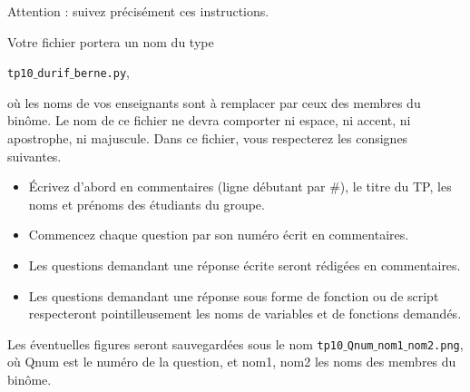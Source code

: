 Attention : suivez précisément ces instructions. 

Votre fichier portera un nom du type 
\begin{center}
  \texttt{tp10$\_$durif$\_$berne.py},
\end{center}
 où les noms de vos enseignants sont à remplacer par ceux des membres du binôme. Le nom de ce 
fichier ne devra comporter ni espace, ni accent, ni apostrophe, ni majuscule.
Dans ce fichier, vous respecterez les consignes suivantes.
\begin{itemize}
  \item \'Ecrivez d'abord en commentaires (ligne débutant par \#), le titre du TP, les noms et prénoms des étudiants du groupe.
  \item Commencez chaque question par son numéro écrit en commentaires.
  \item Les questions demandant une réponse écrite seront rédigées en commentaires.
  \item Les questions demandant une réponse sous forme de fonction ou de script respecteront pointilleusement les noms de variables et de fonctions demandés.
\end{itemize}
Les éventuelles figures seront sauvegardées sous le nom \texttt{tp10$\_$Qnum$\_$nom1$\_$nom2.png}, où Qnum est le numéro de la question, et nom1, nom2 les noms des membres du binôme.

%
%
%	
%
%
%
%
